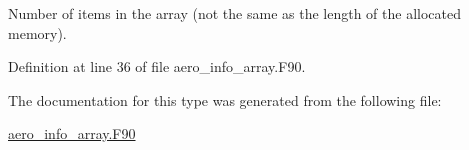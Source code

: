 Number of items in the array (not the same as the length of the allocated memory). 



Definition at line 36 of file aero\+\_\+info\+\_\+array.\+F90.



The documentation for this type was generated from the following file\+:\begin{DoxyCompactItemize}
\item 
\mbox{\hyperlink{aero__info__array_8_f90}{aero\+\_\+info\+\_\+array.\+F90}}\end{DoxyCompactItemize}
